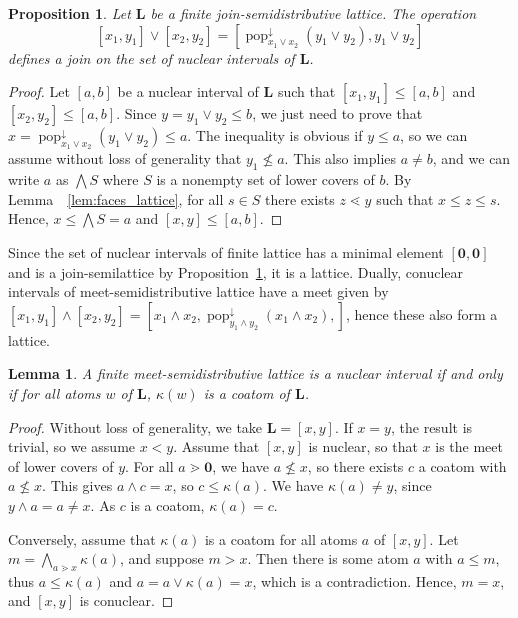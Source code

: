 \documentclass[leqno, 12pt]{amsart}
\numberwithin{equation}{section}
\renewcommand{\L}{\mathbf L}
\newcommand{\popdown}{\operatorname{pop}^\downarrow}
\newcommand{\Lmin}{\mathbf 0}
\numberwithin{equation}{section}
\newtheorem{lem}[thm]{Lemma}
\newtheorem{prop}[thm]{Proposition}
\theoremstyle{remark}
\begin{document}
\begin{prop}\label{FaceJoinProp}
     Let $\L$ be a finite join-semidistributive lattice. The operation $$[x_1,y_1]\vee [x_2,y_2]=\left[\popdown_{x_1\vee x_2} (y_1\vee y_2), y_1\vee y_2\right]$$ defines a join on the set of nuclear intervals of $\L$.
\end{prop}
\begin{proof}
   Let $[a,b]$ be a nuclear interval of $\L$ such that $[x_1,y_1]\le [a,b]$ and $[x_2,y_2]\le [a,b]$. Since $y=y_1\vee y_2 \le b$, we just need to prove that $x=\popdown_{x_1\vee x_2} (y_1\vee y_2)\le a$. The inequality is obvious if $y\le a$, so we can assume without loss of generality that $y_1\nleq a$. This also implies $a\neq b$, and we can write $a$ as $\bigwedge S$ where $S$ is a nonempty set of lower covers of $b$. By Lemma~ \ref{lem:faces_lattice}, for all $s\in S$ there exists $z\lessdot y$ such that $x\le z \le s$. Hence, $x\le \bigwedge S = a$ and $[x, y]\le [a,b]$.
\end{proof}
Since the set of nuclear intervals of finite lattice has a minimal element $[\Lmin, \Lmin]$ and is a join-semilattice by Proposition~\ref{FaceJoinProp}, it is a lattice. Dually, conuclear intervals of meet-semidistributive lattice have a meet given by $[x_1,y_1]\wedge[x_2,y_2]=\left[ x_1\wedge x_2,\popdown_{y_1\wedge y_2} (x_1\wedge x_2),\right]$, hence these also form a lattice.

\begin{lem}
   \label{lem:conuclear}
   A finite meet-semidistributive lattice is a nuclear interval if and only if for all atoms $w$ of $\L$, $\kappa(w)$ is a coatom of $\L$.
\end{lem}
\begin{proof}
Without loss of generality, we take $\L=[x,y]$. If $x=y$, the result is trivial, so we assume $x<y$.
 Assume that $[x,y]$ is nuclear, so that $x$ is the meet of lower covers of $y$. For all $a\gtrdot\Lmin$, we have $a\nleq x$, so there exists $c$ a coatom with $a\nleq x$. This gives $a\wedge c=x$, so $c\le \kappa(a)$. We have $\kappa(a)\neq y$, since $y\wedge a=a\neq x$. As $c$ is a coatom, $\kappa(a)=c$.
 
Conversely, assume that $\kappa(a)$ is a coatom for all atoms $a$ of $[x,y]$. Let $m=\bigwedge_{a\gtrdot x}\kappa(a)$, and suppose $m>x$. Then there is some atom $a$ with $a\le m$, thus $a\le \kappa(a)$ and $a=a\vee \kappa(a)=x$, which is a contradiction. Hence, $m=x$, and $[x,y]$ is conuclear.
\end{proof}
\end{document}

